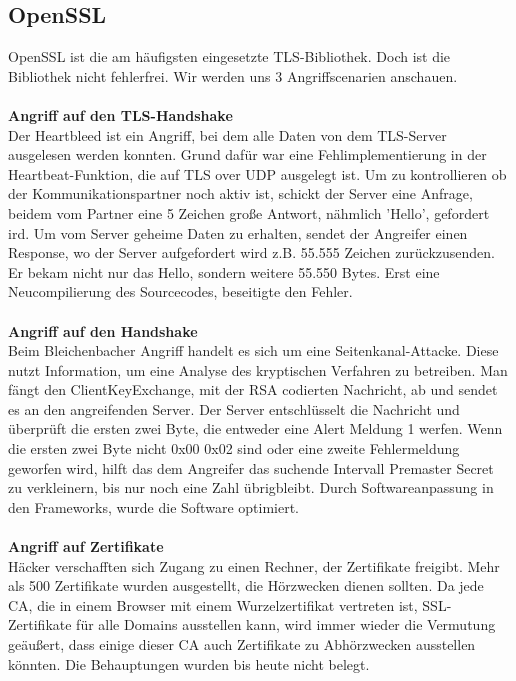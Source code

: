 \documentclass[11pt]{scrartcl}
\begin{document}
\subsection{OpenSSL}
\label{sec:openssl}
OpenSSL ist die am häufigsten eingesetzte TLS-Bibliothek. Doch ist die Bibliothek nicht fehlerfrei. Wir werden uns 3 Angriffscenarien anschauen.\\\\
\noindent
\textbf{Angriff auf den TLS-Handshake}\\
Der Heartbleed ist ein Angriff, bei dem alle Daten von dem TLS-Server ausgelesen werden konnten. Grund dafür war eine Fehlimplementierung in der Heartbeat-Funktion, die auf TLS over UDP ausgelegt ist. Um zu kontrollieren ob der Kommunikationspartner noch aktiv ist, schickt der Server eine Anfrage, beidem vom Partner eine 5 Zeichen große Antwort, nähmlich 'Hello', gefordert ird. Um vom Server geheime Daten zu erhalten, sendet der Angreifer einen Response, wo der Server aufgefordert wird z.B. 55.555 Zeichen zurückzusenden. Er bekam nicht nur das Hello, sondern weitere 55.550 Bytes. Erst eine Neucompilierung des Sourcecodes, beseitigte den Fehler.\\\\
\noindent
\textbf{Angriff auf den Handshake}\\
Beim Bleichenbacher Angriff handelt es sich um eine Seitenkanal-Attacke. Diese nutzt Information, um eine Analyse des kryptischen Verfahren zu betreiben. Man fängt den ClientKeyExchange, mit der RSA codierten Nachricht, ab und sendet es an den angreifenden Server. Der Server entschlüsselt die Nachricht und überprüft die ersten zwei Byte, die entweder eine Alert Meldung 1 werfen. Wenn die ersten zwei Byte nicht 0x00 0x02 sind oder eine zweite Fehlermeldung geworfen wird, hilft das dem Angreifer das suchende Intervall Premaster Secret zu verkleinern, bis nur noch eine Zahl übrigbleibt. Durch Softwareanpassung in den Frameworks, wurde die Software optimiert.\\\\
\noindent
\textbf{Angriff auf Zertifikate}\\
Häcker verschafften sich Zugang zu einen Rechner, der Zertifikate freigibt. Mehr als 500 Zertifikate wurden ausgestellt, die Hörzwecken dienen sollten. \grqq{}Da jede CA, die in einem Browser mit einem Wurzelzertifikat vertreten ist, SSL-Zertifikate für alle Domains ausstellen kann, wird immer wieder die Vermutung geäußert, dass einige dieser CA auch Zertifikate zu Abhörzwecken ausstellen könnten.\grqq{}\cite{1} Die Behauptungen wurden bis heute nicht belegt. \cite{1}

\newpage
\listoffigures
{}
\mbox{}
\nocite{*}


\end{document}
